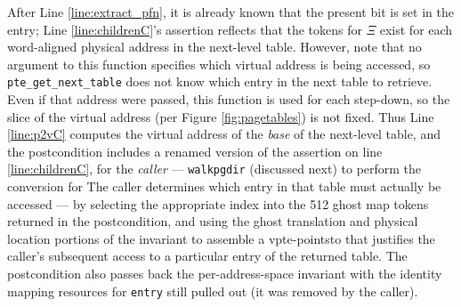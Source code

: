 After Line \ref{line:extract_pfn}, it is already known that the present bit is set in the entry;
Line \ref{line:childrenC}'s assertion reflects that the tokens for $\Xi$ exist for each word-aligned
physical address in the next-level table.
However, note that no argument to this function specifies which virtual address is being accessed,
so \lstinline|pte_get_next_table| does not know which entry in the next table to retrieve.
Even if that address were passed, this function is used for each step-down, so the slice of the
virtual address (per Figure \ref{fig:pagetables}) is not fixed.
Thus Line \ref{line:p2vC} computes the virtual address of the \emph{base} of the next-level table,
and the postcondition includes a renamed version of the assertion on line \ref{line:childrenC},
for the \emph{caller} --- \lstinline|walkpgdir| (discussed next) to perform the conversion for
The caller determines which entry in that table must actually
be accessed --- by selecting the appropriate index into the 512 ghost map tokens returned in the postcondition,
and using the ghost translation and physical location portions of the invariant to assemble a vpte-pointsto
that justifies the caller's subsequent access to a particular entry of the returned table.
The postcondition also passes back the per-address-space invariant with the
identity mapping resources for \lstinline|entry| still pulled out (it was removed by the caller).



